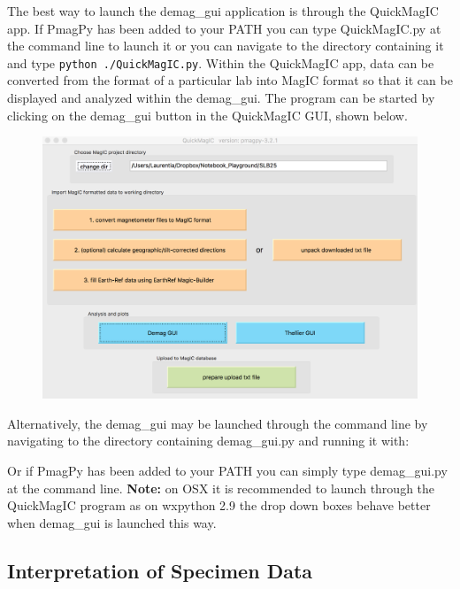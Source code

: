 The best way to launch the demag\_gui application is through the
QuickMagIC app. If PmagPy has been added to your PATH you can type
QuickMagIC.py at the command line to launch it or you can navigate to
the directory containing it and type \texttt{python\ ./QuickMagIC.py}.
Within the QuickMagIC app, data can be converted from the format of a
particular lab into MagIC format so that it can be displayed and
analyzed within the demag\_gui. The program can be started by clicking
on the demag\_gui button in the QuickMagIC GUI, shown below.

\begin{figure}[htbp]
\centering
\includegraphics{./images/QuickMagicLauncher.png}
\caption{}
\end{figure}

Alternatively, the demag\_gui may be launched through the command line
by navigating to the directory containing demag\_gui.py and running it
with:

\begin{Shaded}
\begin{Highlighting}[]
 
\end{Highlighting}
\end{Shaded}

Or if PmagPy has been added to your PATH you can simply type
demag\_gui.py at the command line. \textbf{Note:} on OSX it is
recommended to launch through the QuickMagIC program as on wxpython 2.9
the drop down boxes behave better when demag\_gui is launched this way.

\subsection{Interpretation of Specimen
Data}\label{interpretation-of-specimen-data}

